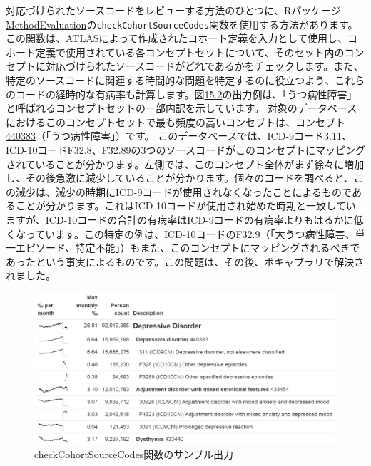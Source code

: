\documentclass[
  11pt]{book}
\theoremstyle{definition}
\theoremstyle{definition}
\theoremstyle{definition}
\theoremstyle{definition}
\theoremstyle{remark}
\begin{document}
対応づけられたソースコードをレビューする方法のひとつに、Rパッケージ\href{https://ohdsi.github.io/MethodEvaluation/}{MethodEvaluation}の\texttt{checkCohortSourceCodes}関数を使用する方法があります。この関数は、ATLASによって作成されたコホート定義を入力として使用し、コホート定義で使用されている各コンセプトセットについて、そのセット内のコンセプトに対応づけられたソースコードがどれであるかをチェックします。また、特定のソースコードに関連する時間的な問題を特定するのに役立つよう、これらのコードの経時的な有病率も計算します。図\href{https://ohdsi.github.io/TheBookOfOhdsi/DataQuality.html\#fig:sourceCodes}{15.2}の出力例は、「うつ病性障害」と呼ばれるコンセプトセットの一部内訳を示しています。 対象のデータベースにおけるこのコンセプトセットで最も頻度の高いコンセプトは、コンセプト\href{http://athena.ohdsi.org/search-terms/terms/440383}{440383}（「うつ病性障害」）です。 このデータベースでは、ICD-9コード3.11、ICD-10コードF32.8、F32.89の3つのソースコードがこのコンセプトにマッピングされていることが分かります。左側では、このコンセプト全体がまず徐々に増加し、その後急激に減少していることが分かります。個々のコードを調べると、この減少は、減少の時期にICD-9コードが使用されなくなったことによるものであることが分かります。これはICD-10コードが使用され始めた時期と一致していますが、ICD-10コードの合計の有病率はICD-9コードの有病率よりもはるかに低くなっています。この特定の例は、ICD-10コードのF32.9（「大うつ病性障害、単一エピソード、特定不能」）もまた、このコンセプトにマッピングされるべきであったという事実によるものです。この問題は、その後、ボキャブラリで解決されました。

\begin{figure}

{\centering \includegraphics[width=1\linewidth]{images/DataQuality/sourceCodes} 

}

\caption{checkCohortSourceCodes関数のサンプル出力}\label{fig:sourceCodes}
\end{figure}
\end{document}
